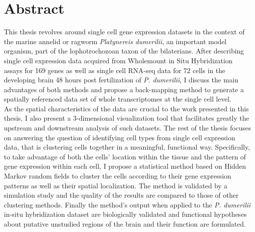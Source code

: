 \begingroup
\let\clearpage\relax
\let\cleardoublepage\relax
\let\cleardoublepage\relax

\chapter*{Abstract}

This thesis revolves around single cell gene expression datasets in the context of the marine annelid or ragworm \emph{Platynereis dumerilii}, an important model organism, part of the lophotrochozoan taxon of the bilaterians. After describing single cell expression data acquired from Wholemount in Situ Hybridization assays for 169 genes as well as single cell RNA-seq data for 72 cells in the developing brain 48 hours post fertilization of \emph{P. dumerilii}, I discuss the main advantages of both methods and propose a back-mapping method to generate a spatially referenced data set of whole transcriptomes at the single cell level.\\

As the spatial characteristics of the data are crucial to the work presented in this thesis, I also present a 3-dimensional visualization tool that facilitates greatly the upstream and downstream analysis of such datasets. The rest of the thesis focuses on answering the question of identifying cell types from single cell expression data, that is clustering cells together in a meaningful, functional way. Specifically, to take advantage of both the cells' location within the tissue and the pattern of gene expression within each cell, I propose a statistical method based on Hidden Markov random fields to cluster the cells according to their gene expression patterns as well as their spatial localization. The method is validated by a simulation study and the quality of the results are compared to those of other clustering methods. Finally the method's output when applied to the \emph{P. dumerilii} in-situ hybridization dataset are biologically validated and functional hypotheses about putative unstudied regions of the brain and their function are formulated.



\vfill



\endgroup			

\vfill